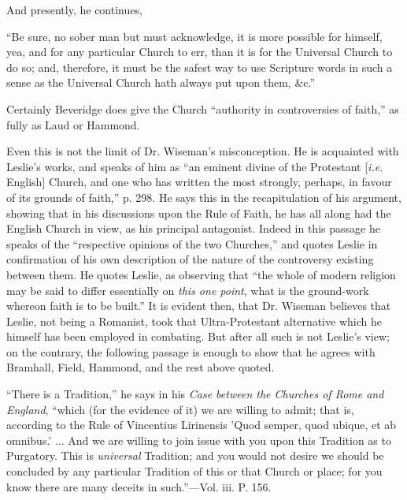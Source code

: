 And
presently, he continues,

``Be
sure, no sober man but must acknowledge, it is more possible for
himself, yea, and for any particular Church to err, than it is for the
Universal Church to do so; and, therefore, it must be the safest way to
use Scripture words in such a sense as the Universal Church hath always
put upon them, \&c.''

Certainly
Beveridge does give the Church ``authority in controversies of
faith,'' as fully as Laud or Hammond.

Even this
is not the limit of Dr. Wiseman's misconception. He is acquainted with
Leslie's works, and speaks of him as ``an eminent divine of the
Protestant [\emph{i.e}. English] Church, and one who has written the
most strongly, perhaps, in favour of its grounds of faith,'' p. 298. He
says this in the recapitulation of his argument, showing that in his
discussions upon the Rule of Faith, he has all along had the English
Church in view, as his principal antagonist. Indeed in this passage he
speaks of the ``respective opinions of the two Churches,'' and quotes
Leslie in confirmation of his own description of the nature of the
controversy existing between them. He quotes Leslie, as observing that ``the whole of modern religion may be said to differ essentially on \emph{this
one point}, what is the ground-work whereon faith is to be built.''
It is evident then, that Dr. Wiseman believes that Leslie, not being a
Romanist, took that Ultra-Protestant alternative which he himself has
been employed in combating. But after all such is not Leslie's view;
on the contrary, the following passage
is enough to show that he agrees with Bramhall, Field, Hammond, and the
rest above quoted.

``There
is a Tradition,'' he says in his \emph{Case between the Churches of Rome
and England}, ``which (for the evidence of it) we are willing to
admit; that is, according to the Rule of Vincentius Lirinensis 'Quod
semper, quod ubique, et ab omnibus.' ... And we are willing to join
issue with you upon this Tradition as to Purgatory. This is \emph{universal}
Tradition; and you would not desire we should be concluded by any
particular Tradition of this or that Church or place; for you know there
are many deceits in such.''—Vol. iii. P. 156.

